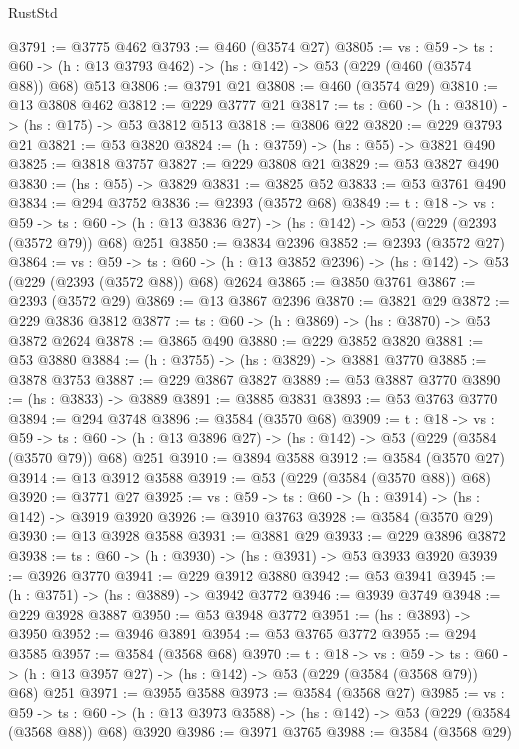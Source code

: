 \begin{lexlean}{RustStd}
\begin{coremodule}
@3791 := @3775 @462
@3793 := @460 (@3574 @27)
@3805 := {vs : @59} ->
  {ts : @60} -> (h : @13 @3793 @462) -> (hs : @142) -> @53 (@229 (@460 (@3574 @88)) @68) @513
@3806 := @3791 @21
@3808 := @460 (@3574 @29)
@3810 := @13 @3808 @462
@3812 := @229 @3777 @21
@3817 := {ts : @60} -> (h : @3810) -> (hs : @175) -> @53 @3812 @513
@3818 := @3806 @22
@3820 := @229 @3793 @21
@3821 := @53 @3820
@3824 := (h : @3759) -> (hs : @55) -> @3821 @490
@3825 := @3818 @3757
@3827 := @229 @3808 @21
@3829 := @53 @3827 @490
@3830 := (hs : @55) -> @3829
@3831 := @3825 @52
@3833 := @53 @3761 @490
@3834 := @294 @3752
@3836 := @2393 (@3572 @68)
@3849 := {t : @18} ->
  {vs : @59} ->
  {ts : @60} -> (h : @13 @3836 @27) -> (hs : @142) -> @53 (@229 (@2393 (@3572 @79)) @68) @251
@3850 := @3834 @2396
@3852 := @2393 (@3572 @27)
@3864 := {vs : @59} ->
  {ts : @60} -> (h : @13 @3852 @2396) -> (hs : @142) -> @53 (@229 (@2393 (@3572 @88)) @68) @2624
@3865 := @3850 @3761
@3867 := @2393 (@3572 @29)
@3869 := @13 @3867 @2396
@3870 := @3821 @29
@3872 := @229 @3836 @3812
@3877 := {ts : @60} -> (h : @3869) -> (hs : @3870) -> @53 @3872 @2624
@3878 := @3865 @490
@3880 := @229 @3852 @3820
@3881 := @53 @3880
@3884 := (h : @3755) -> (hs : @3829) -> @3881 @3770
@3885 := @3878 @3753
@3887 := @229 @3867 @3827
@3889 := @53 @3887 @3770
@3890 := (hs : @3833) -> @3889
@3891 := @3885 @3831
@3893 := @53 @3763 @3770
@3894 := @294 @3748
@3896 := @3584 (@3570 @68)
@3909 := {t : @18} ->
  {vs : @59} ->
  {ts : @60} -> (h : @13 @3896 @27) -> (hs : @142) -> @53 (@229 (@3584 (@3570 @79)) @68) @251
@3910 := @3894 @3588
@3912 := @3584 (@3570 @27)
@3914 := @13 @3912 @3588
@3919 := @53 (@229 (@3584 (@3570 @88)) @68)
@3920 := @3771 @27
@3925 := {vs : @59} -> {ts : @60} -> (h : @3914) -> (hs : @142) -> @3919 @3920
@3926 := @3910 @3763
@3928 := @3584 (@3570 @29)
@3930 := @13 @3928 @3588
@3931 := @3881 @29
@3933 := @229 @3896 @3872
@3938 := {ts : @60} -> (h : @3930) -> (hs : @3931) -> @53 @3933 @3920
@3939 := @3926 @3770
@3941 := @229 @3912 @3880
@3942 := @53 @3941
@3945 := (h : @3751) -> (hs : @3889) -> @3942 @3772
@3946 := @3939 @3749
@3948 := @229 @3928 @3887
@3950 := @53 @3948 @3772
@3951 := (hs : @3893) -> @3950
@3952 := @3946 @3891
@3954 := @53 @3765 @3772
@3955 := @294 @3585
@3957 := @3584 (@3568 @68)
@3970 := {t : @18} ->
  {vs : @59} ->
  {ts : @60} -> (h : @13 @3957 @27) -> (hs : @142) -> @53 (@229 (@3584 (@3568 @79)) @68) @251
@3971 := @3955 @3588
@3973 := @3584 (@3568 @27)
@3985 := {vs : @59} ->
  {ts : @60} -> (h : @13 @3973 @3588) -> (hs : @142) -> @53 (@229 (@3584 (@3568 @88)) @68) @3920
@3986 := @3971 @3765
@3988 := @3584 (@3568 @29)

\end{coremodule}
\end{lexlean}
